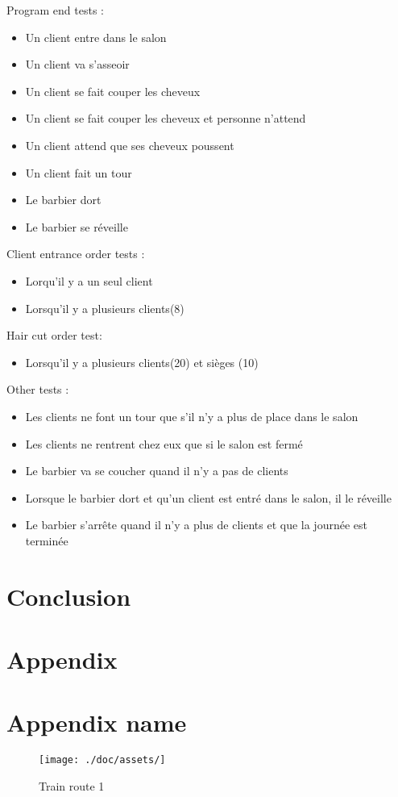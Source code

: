 \documentclass{article}
\begin{document}
    Program end tests :
    \begin{itemize}
        \item Un client entre dans le salon
        \item Un client va s'asseoir
        \item Un client se fait couper les cheveux
        \item Un client se fait couper les cheveux et personne n'attend
        \item Un client attend que ses cheveux poussent
        \item Un client fait un tour
        \item Le barbier dort
        \item Le barbier se réveille
    \end{itemize}

    Client entrance order tests :
    \begin{itemize}
        \item Lorqu'il y a un seul client
        \item Lorsqu'il y a plusieurs clients(8)
    \end{itemize}

    Hair cut order test:
    \begin{itemize}
        \item Lorsqu'il y a plusieurs clients(20) et sièges (10)
    \end{itemize}

    Other tests :
    \begin{itemize}
        \item Les clients ne font un tour que s'il n'y a plus de place dans le salon
        \item Les clients ne rentrent chez eux que si le salon est fermé
        \item Le barbier va se coucher quand il n'y a pas de clients
        \item Lorsque le barbier dort et qu'un client est entré dans le salon, il le réveille
        \item Le barbier s'arrête quand il n'y a plus de clients et que la journée est terminée
    \end{itemize}

    \section{Conclusion}

    \section*{Appendix}

    \section{Appendix name}
    \begin{figure}[!htb]
        \centering
        \texttt{[image: ./doc/assets/]}
        \caption{Train route 1}
    \end{figure}
\end{document}
